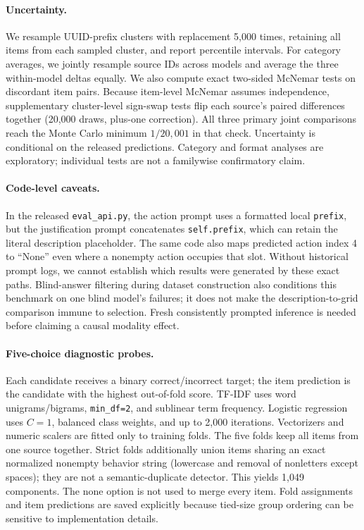 \paragraph{Uncertainty.} We resample UUID-prefix clusters with replacement 5,000 times, retaining all items from each sampled cluster, and report percentile intervals. For category averages, we jointly resample source IDs across models and average the three within-model deltas equally. We also compute exact two-sided McNemar tests on discordant item pairs. Because item-level McNemar assumes independence, supplementary cluster-level sign-swap tests flip each source's paired differences together (20,000 draws, plus-one correction). All three primary joint comparisons reach the Monte Carlo minimum $1/20{,}001$ in that check. Uncertainty is conditional on the released predictions. Category and format analyses are exploratory; individual tests are not a familywise confirmatory claim.

\paragraph{Code-level caveats.} In the released \texttt{eval\_api.py}, the action prompt uses a formatted local \texttt{prefix}, but the justification prompt concatenates \texttt{self.prefix}, which can retain the literal description placeholder. The same code also maps predicted action index 4 to ``None'' even where a nonempty action occupies that slot. Without historical prompt logs, we cannot establish which results were generated by these exact paths. Blind-answer filtering during dataset construction also conditions this benchmark on one blind model's failures; it does not make the description-to-grid comparison immune to selection. Fresh consistently prompted inference is needed before claiming a causal modality effect.

\paragraph{Five-choice diagnostic probes.} Each candidate receives a binary correct/incorrect target; the item prediction is the candidate with the highest out-of-fold score. TF-IDF uses word unigrams/bigrams, \texttt{min\_df=2}, and sublinear term frequency. Logistic regression uses $C=1$, balanced class weights, and up to 2,000 iterations. Vectorizers and numeric scalers are fitted only to training folds. The five folds keep all items from one source together. Strict folds additionally union items sharing an exact normalized nonempty behavior string (lowercase and removal of nonletters except spaces); they are not a semantic-duplicate detector. This yields 1,049 components. The none option is not used to merge every item. Fold assignments and item predictions are saved explicitly because tied-size group ordering can be sensitive to implementation details.

